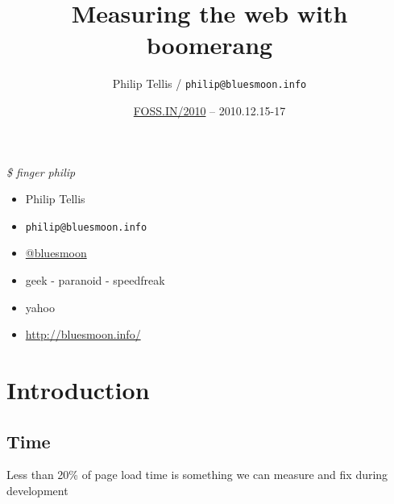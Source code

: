 \documentclass{beamer}
\author{Philip Tellis / \texttt{philip@bluesmoon.info}}
\title{Measuring the web with boomerang}
\date{\href{http://foss.in/2010/}{FOSS.IN/2010} -- 2010.12.15-17}
\begin{document}
\begin{frame}
  \titlepage
\end{frame}


\begin{frame}{\textit{\$ finger philip}}
  \begin{itemize}
  \item Philip Tellis
  \item \small{\texttt{philip@bluesmoon.info}}
  \item \href{http://twitter.com/bluesmoon}{@bluesmoon}
  \item geek - paranoid - speedfreak
  \item yahoo
  \item \href{http://bluesmoon.info/}{http://bluesmoon.info/}
  \end{itemize}
\end{frame}


\section{Introduction}
\label{sec:intro}

\subsection{Time}

\begin{frame}{}
\end{frame}

\begin{frame}{}
\end{frame}

\begin{frame}{}
\end{frame}

\begin{frame}{}
  \begin{center}
  Less than 20\% of page load time is something we can measure and fix during development
  \end{center}
\end{frame}
\end{document}
